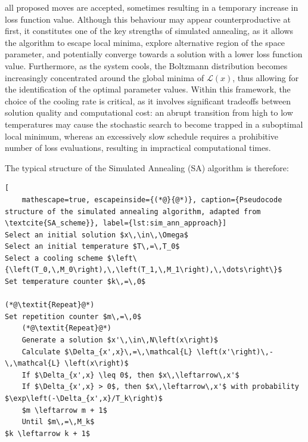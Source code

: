 all proposed moves are accepted, sometimes resulting in a temporary increase in loss function value. Although this behaviour may 
appear counterproductive at first, it constitutes one of the key strengths of simulated annealing, as it allows the algorithm to 
escape local minima, explore alternative region of the space parameter, and potentially converge towards a solution with a lower 
loss function value. Furthermore, as the system cools, the Boltzmann distribution becomes increasingly concentrated around the 
global minima of $\mathcal{L} \left(x\right)$, thus allowing for the identification of the optimal parameter values. Within this 
framework, the choice of the cooling rate is critical, as it involves significant tradeoffs between solution quality and computational 
cost: an abrupt transition from high to low temperatures may cause the stochastic search to become trapped in a suboptimal local 
minimum, whereas an excessively slow schedule requires a prohibitive number of loss evaluations, resulting in impractical 
computational times. 

The typical structure of the Simulated Annealing (SA) algorithm is therefore:
\begin{lstlisting}[
    mathescape=true, escapeinside={(*@}{@*)}, caption={Pseudocode structure of the simulated annealing algorithm, adapted from \textcite{SA_scheme}}, label={lst:sim_ann_approach}]
Select an initial solution $x\,\in\,\Omega$
Select an initial temperature $T\,=\,T_0$
Select a cooling scheme $\left\{\left(T_0,\,M_0\right),\,\left(T_1,\,M_1\right),\,\dots\right\}$
Set temperature counter $k\,=\,0$

(*@\textit{Repeat}@*)
Set repetition counter $m\,=\,0$
    (*@\textit{Repeat}@*)
    Generate a solution $x'\,\in\,N\left(x\right)$
    Calculate $\Delta_{x',x}\,=\,\mathcal{L} \left(x'\right)\,-\,\mathcal{L} \left(x\right)$
    If $\Delta_{x',x} \leq 0$, then $x\,\leftarrow\,x'$
    If $\Delta_{x',x} > 0$, then $x\,\leftarrow\,x'$ with probability $\exp\left(-\Delta_{x',x}/T_k\right)$
    $m \leftarrow m + 1$
    Until $m\,=\,M_k$
$k \leftarrow k + 1$
\end{lstlisting}

